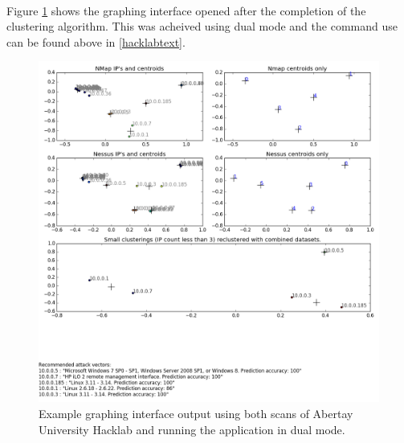 \paragraph{} Figure \ref{dual} shows the graphing interface opened after the completion of the clustering algorithm. This was acheived using dual mode and the command use can be found above in \ref{hacklabtext}.
\begin{figure}[!h]
\centering
\includegraphics[width=5.5in]{./Figures/dual.png}
\caption{Example graphing interface output using both scans of Abertay University Hacklab and running the application in dual mode. }
\label{dual}
\end{figure}

